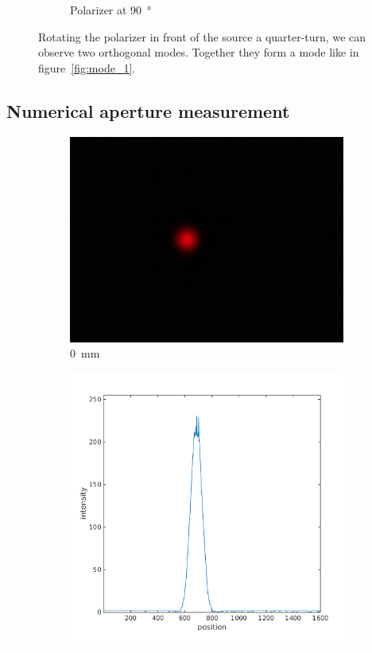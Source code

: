 \documentclass[a4paper, 12pt]{paper}
\begin{document}
\begin{figure}[H]
\begin{subfigure}[t]{0.3\textwidth}
        \caption{Polarizer at \SI{90}{\degree}}
    \end{subfigure}
    \caption{Rotating the polarizer in front of the source a quarter-turn, we can observe two orthogonal modes.
        Together they form a mode like in figure~\ref{fig:mode_1}.}
\label{fig:polarizer}
\end{figure}

\subsection{Numerical aperture measurement}

\begin{figure}[H]
    \centering
    \begin{subfigure}[t]{0.5\textwidth}
        \includegraphics[width=\textwidth]{img/0mm.jpg}
        \caption{\SI{0}{\milli\meter}}
    \end{subfigure}
    \begin{subfigure}[t]{0.4\textwidth}
        \includegraphics[width=\textwidth]{img/0mm_line}

\end{subfigure}
\end{figure}
\end{document}
